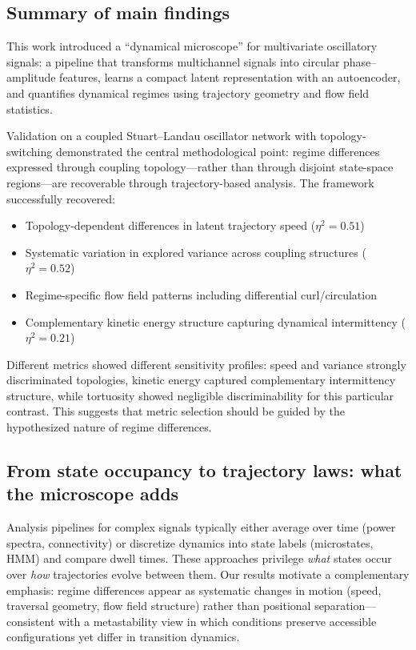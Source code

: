 \documentclass[5p,twocolumn,authoryear]{elsarticle}
\begin{document}
\subsection{Summary of main findings}

This work introduced a ``dynamical microscope'' for multivariate oscillatory signals: a pipeline that transforms multichannel signals into circular phase--amplitude features, learns a compact latent representation with an autoencoder, and quantifies dynamical regimes using trajectory geometry and flow field statistics.

Validation on a coupled Stuart--Landau oscillator network with topology-switching demonstrated the central methodological point: regime differences expressed through coupling topology---rather than through disjoint state-space regions---are recoverable through trajectory-based analysis. The framework successfully recovered:
\begin{itemize}
    \item Topology-dependent differences in latent trajectory speed ($\eta^2 = 0.51$)
    \item Systematic variation in explored variance across coupling structures ($\eta^2 = 0.52$)
    \item Regime-specific flow field patterns including differential curl/circulation
    \item Complementary kinetic energy structure capturing dynamical intermittency ($\eta^2 = 0.21$)
\end{itemize}

Different metrics showed different sensitivity profiles: speed and variance strongly discriminated topologies, kinetic energy captured complementary intermittency structure, while tortuosity showed negligible discriminability for this particular contrast. This suggests that metric selection should be guided by the hypothesized nature of regime differences.

\subsection{From state occupancy to trajectory laws: what the microscope adds}

Analysis pipelines for complex signals typically either average over time (power spectra, connectivity) or discretize dynamics into state labels (microstates, HMM) and compare dwell times. These approaches privilege \emph{what} states occur over \emph{how} trajectories evolve between them. Our results motivate a complementary emphasis: regime differences appear as systematic changes in motion (speed, traversal geometry, flow field structure) rather than positional separation---consistent with a metastability view in which conditions preserve accessible configurations yet differ in transition dynamics.
\end{document}
